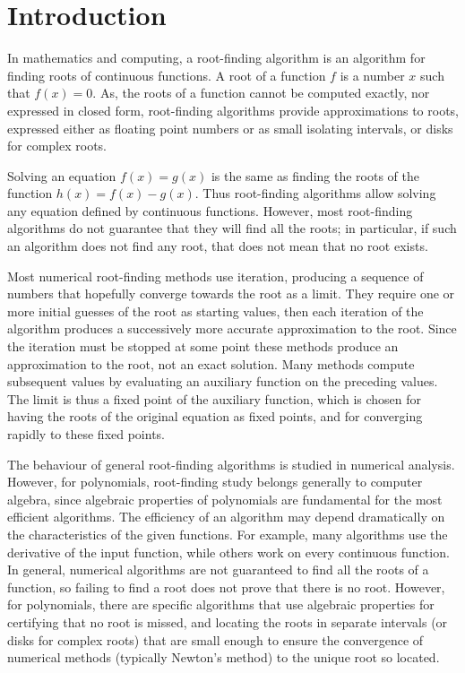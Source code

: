 \documentclass[preprint,12pt]{elsarticle}
\begin{document}

\section{Introduction}
\label{S:1}

In mathematics and computing, a root-finding algorithm is an algorithm for finding roots of continuous functions. A root of a function $f$ is a number $x$ such that $f(x)=0$. As, the roots of a function cannot be computed exactly, nor expressed in closed form, root-finding algorithms provide approximations to roots, expressed either as floating point numbers or as small isolating intervals, or disks for complex roots.

Solving an equation $f(x)=g(x)$ is the same as finding the roots of the function $h(x)=f(x)-g(x)$. Thus root-finding algorithms allow solving any equation defined by continuous functions. However, most root-finding algorithms do not guarantee that they will find all the roots; in particular, if such an algorithm does not find any root, that does not mean that no root exists.

Most numerical root-finding methods use iteration, producing a sequence of numbers that hopefully converge towards the root as a limit. They require one or more initial guesses of the root as starting values, then each iteration of the algorithm produces a successively more accurate approximation to the root. Since the iteration must be stopped at some point these methods produce an approximation to the root, not an exact solution. Many methods compute subsequent values by evaluating an auxiliary function on the preceding values. The limit is thus a fixed point of the auxiliary function, which is chosen for having the roots of the original equation as fixed points, and for converging rapidly to these fixed points.

The behaviour of general root-finding algorithms is studied in numerical analysis. However, for polynomials, root-finding study belongs generally to computer algebra, since algebraic properties of polynomials are fundamental for the most efficient algorithms. The efficiency of an algorithm may depend dramatically on the characteristics of the given functions. For example, many algorithms use the derivative of the input function, while others work on every continuous function. In general, numerical algorithms are not guaranteed to find all the roots of a function, so failing to find a root does not prove that there is no root. However, for polynomials, there are specific algorithms that use algebraic properties for certifying that no root is missed, and locating the roots in separate intervals (or disks for complex roots) that are small enough to ensure the convergence of numerical methods (typically Newton's method) to the unique root so located.
\end{document}
